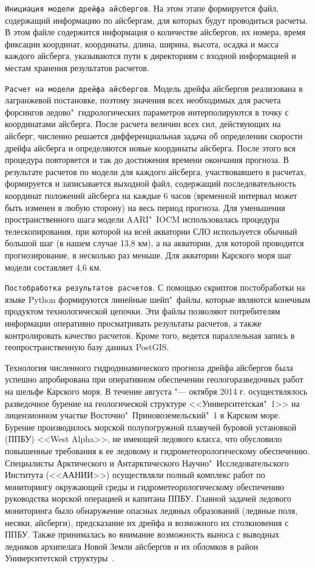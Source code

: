 \verb|Инициация модели дрейфа айсбергов|. На этом этапе формируется файл, содержащий информацию по айсбергам, для которых будут проводиться расчеты. В этом файле содержится информация о количестве айсбергов, их номера, время фиксации координат, координаты, длина, ширина, высота, осадка и масса каждого айсберга, указываются пути к директориям с входной информацией и местам хранения результатов расчетов.

\verb|Расчет на модели дрейфа айсбергов|. Модель дрейфа айсбергов реализована в лагранжевой постановке, поэтому значения всех необходимых для расчета форсингов ледово"~гидрологических параметров интерполируются в точку с координатами айсберга. После расчета величин всех сил, действующих на айсберг, численно решается дифференциальная задача об определении скорости дрейфа айсберга и определяются новые координаты айсберга. После этого вся процедура повторяется и так до достижения времени окончания прогноза. В результате расчетов по модели для каждого айсберга, участвовавшего в расчетах, формируется и записывается выходной файл, содержащий последовательность координат положений айсберга на каждые 6 часов (временной интервал может быть изменен в любую сторону) на весь период прогноза. Для уменьшения пространственного шага модели AARI"~IOCM использовалась процедура телескопирования, при которой на всей акватории СЛО используется обычный большой шаг (в нашем случае 13,8 км), а на акватории, для которой проводится прогнозирование, в несколько раз меньше. Для акватории Карского моря шаг модели составляет 4,6 км.

\verb|Постобработка результатов расчетов|. С помощью скриптов постобработки
на языке Python формируются линейные шейп"~файлы, которые являются конечным 
продуктом технологической цепочки. Эти файлы позволяют потребителям информации оперативно просматривать результаты расчетов, а также контролировать качество расчетов. Кроме того, ведется параллельная запись в геопространственную базу данных PostGIS.

Технология численного гидродинамического прогноза дрейфа айсбергов была успешно апробирована при оперативном обеспечении геологоразведочных работ на шельфе Карского моря. В течение августа "--- октября 2014 г. осуществлялось разведочное бурение на геологической структуре <<Университетская"~1>> на лицензионном участке Восточно"~Приновоземельский"~1 в Карском море. Бурение производилось морской полупогружной плавучей буровой установкой (ППБУ) <<West Alpha>>, не имеющей ледового класса, что обусловило повышенные требования к ее ледовому и гидрометеорологическому обеспечению. Специалисты Арктического и Антарктического Научно"~Исследовательского Института (<<ААНИИ>>) осуществляли полный комплекс работ по мониторингу окружающей среды и гидрометеорологическому обеспечению руководства морской операцией и капитана ППБУ. Главной задачей ледового мониторинга было обнаружение опасных ледяных образований (ледяные поля, несяки, айсберги), предсказание их дрейфа и возможного их столкновения с ППБУ. Также принималась во внимание возможность выноса с выводных ледников архипелага Новой Земли айсбергов и их обломков в район Университетской структуры~\cite{Mironov_Smirnov_Iceberg_2015}.

